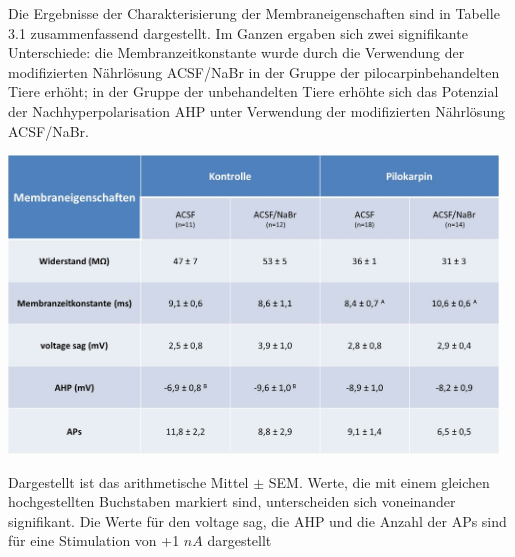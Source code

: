 \documentclass[a4paper,11pt]{report}
\begin{document}
{%




Die Ergebnisse der Charakterisierung der Membraneigenschaften sind in Tabelle 3.1 zusammenfassend dargestellt. Im Ganzen ergaben sich zwei signifikante Unterschiede: die Membranzeitkonstante wurde durch die Verwendung der modifizierten Nährlösung ACSF/NaBr in der Gruppe der pilocarpinbehandelten Tiere erhöht; in der Gruppe der unbehandelten Tiere erhöhte sich das Potenzial der Nachhyperpolarisation AHP unter Verwendung der modifizierten Nährlösung ACSF/NaBr.

\begin{table}[H]
\begin{center}
\includegraphics[width= 13cm]{Abbildungen/Membraneigenschaften/tabelle_membraneigenschaften.jpg}
\caption{Dargestellt ist das arithmetische Mittel $\pm$ SEM. Werte, die mit einem gleichen hochgestellten Buchstaben markiert sind, unterscheiden sich voneinander signifikant. Die Werte für den voltage sag, die AHP und die Anzahl der APs sind für eine Stimulation von +1 $nA$ dargestellt}
\end{center}
\end{table}

}
\end{document}
